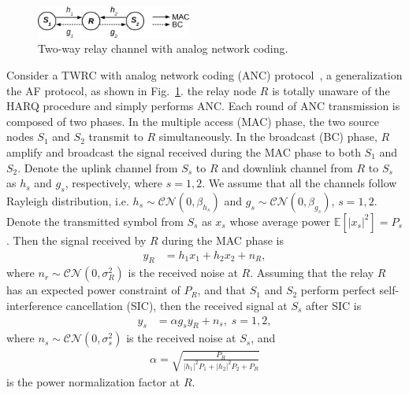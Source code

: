 \documentclass{article}
\begin{document}
\begin{figure}[!t]
  \centering
  \includegraphics[width=2.0in]{./figs/model.eps}
  \caption{Two-way relay channel with analog network coding.}
  \label{fig:model}
\end{figure}

Consider a TWRC with analog network coding (ANC) protocol~\cite{choi2013energy}, 
a generalization the AF protocol, as shown in Fig.~\ref{fig:model}. the relay
node $R$ is totally unaware of the HARQ procedure and simply performs ANC. Each round of ANC
transmission is composed of two phases. In the multiple access (MAC) phase, the
two source nodes $S_1$ and $S_2$ transmit to $R$ simultaneously. In the
broadcast (BC) phase, $R$ amplify and broadcast the signal received during the
MAC phase to both $S_1$ and $S_2$.
Denote the uplink channel from $S_s$ to $R$ and downlink channel from $R$ to
$S_s$ as $h_s$ and $g_s$, respectively, where $s=1,2$. We assume that all
the channels follow Rayleigh distribution, i.e.
$h_s\sim\mathcal{CN}(0,\beta_{h_s})$ and $g_s\sim\mathcal{CN}(0,\beta_{g_s})$,
$s=1,2$. Denote the transmitted symbol from $S_s$ as $x_s$ whose average power
$\mathbb{E}[|x_s|^2]=P_s$. Then the signal received by $R$ during the MAC phase
is
\begin{align}
  y_R & = h_1x_1+h_2x_2+n_R,
  \label{eq:y_R}
\end{align}
where $n_r\sim\mathcal{CN}(0,\sigma_R^2)$ is the received noise at $R$. Assuming
that the relay $R$ has an expected power constraint of $P_R$, and that
$S_1$ and $S_2$ perform perfect self-interference cancellation (SIC), then the
received signal at $S_s$ after SIC is
\begin{align}
  y_s &= \alpha g_s y_R + n_s,\;s=1,2,
  \label{eq:y_s}
\end{align}
where $n_s\sim\mathcal{CN}(0,\sigma_s^2)$ is the received noise at $S_s$, and
\begin{align}
  \alpha = \sqrt{\frac{P_R}{|h_1|^2P_1 + |h_2|^2P_2+P_R}}
\end{align}
is the power normalization factor at $R$.
\end{document}
